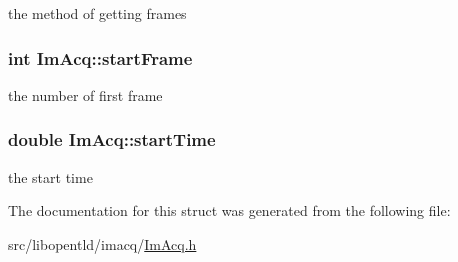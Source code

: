 the method of getting frames 

\hypertarget{structImAcq_a1f52cf31c1f19f27846d481654a370e2}{
\subsubsection[{start\-Frame}]{\setlength{\rightskip}{0pt plus 5cm}int Im\-Acq\-::start\-Frame}}\label{structImAcq_a1f52cf31c1f19f27846d481654a370e2}


the number of first frame 

\hypertarget{structImAcq_a6a4ccba3d36d599a7902a943f1f6a08c}{
\subsubsection[{start\-Time}]{\setlength{\rightskip}{0pt plus 5cm}double Im\-Acq\-::start\-Time}}\label{structImAcq_a6a4ccba3d36d599a7902a943f1f6a08c}


the start time 



The documentation for this struct was generated from the following file\-:\begin{DoxyCompactItemize}
\item 
src/libopentld/imacq/\hyperlink{ImAcq_8h}{Im\-Acq.\-h}\end{DoxyCompactItemize}
